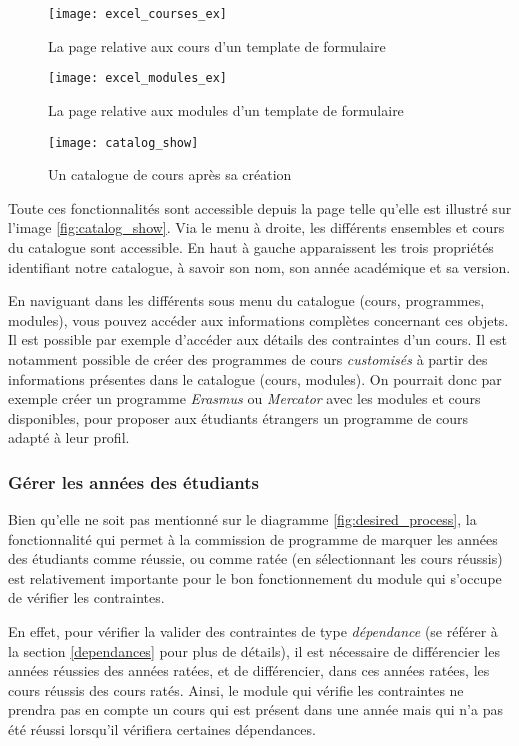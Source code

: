 \begin{figure}
\centering
\caption{La page relative aux cours d'un template de formulaire}
\label{fig:excel_courses_ex}
\texttt{[image: excel\_courses\_ex]}
\end{figure}

\begin{figure}
\centering
\caption{La page relative aux modules d'un template de formulaire}
\label{fig:excel_modules_ex}
\texttt{[image: excel\_modules\_ex]}
\end{figure}

\begin{figure}
\centering
\caption{Un catalogue de cours après sa création}
\label{catalog_show}
\texttt{[image: catalog\_show]}
\end{figure}

Toute ces fonctionnalités sont accessible depuis la page telle qu'elle est illustré sur l'image \ref{fig:catalog_show}. Via le menu à droite, les différents ensembles et cours du catalogue sont accessible. En haut à gauche apparaissent les trois propriétés identifiant notre catalogue, à savoir son nom, son année académique et sa version. 

En naviguant dans les différents sous menu du catalogue (cours, programmes, modules), vous pouvez accéder aux informations complètes concernant ces objets. Il est possible par exemple d'accéder aux détails des contraintes d'un cours. Il est notamment possible de créer des programmes de cours \textit{customisés} à partir des informations présentes dans le catalogue (cours, modules). On pourrait donc par exemple créer un programme \textit{Erasmus} ou \textit{Mercator} avec les modules et cours disponibles, pour proposer aux étudiants étrangers un programme de cours adapté à leur profil.

\subsubsection{Gérer les années des étudiants}
\label{year_mgmt}
Bien qu'elle ne soit pas mentionné sur le diagramme \ref{fig:desired_process}, la fonctionnalité qui permet à la commission de programme de marquer les années des étudiants comme réussie, ou comme ratée (en sélectionnant les cours réussis) est relativement importante pour le bon fonctionnement du module qui s'occupe de vérifier les contraintes. 


En effet, pour vérifier la valider des contraintes de type \textit{dépendance} (se référer à  la section \ref{dependances} pour plus de détails), il est nécessaire de différencier les années réussies des années ratées, et de différencier, dans ces années ratées, les cours réussis des cours ratés. Ainsi, le module qui vérifie les contraintes ne prendra pas en compte un cours qui est présent dans une année mais qui n'a pas été réussi lorsqu'il vérifiera certaines dépendances. 

